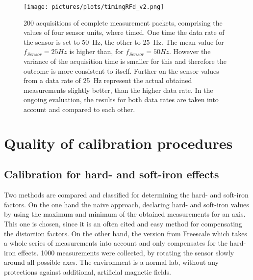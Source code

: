 \begin{figure}[h]
\centering
\texttt{[image: pictures/plots/timingRFd\_v2.png]}
\caption{200 acquisitions of complete measurement packets, comprising the values of four sensor units, where timed. One time the data rate of the sensor is set to \SI{50}{\Hz}, the other to \SI{25}{\Hz}. The mean value for $ f_{Sensor}=25\si{Hz} $ is higher than, for $ f_{Sensor}=50\si{Hz} $. However the variance of the acquisition time is smaller for this and therefore the outcome is more consistent to itself. Further on the sensor values from a data rate of \SI{25}{\Hz} represent the actual obtained measurements slightly better, than the higher data rate. In the ongoing evaluation, the results for both data rates are taken into account and compared to each other.}
\label{fig:sensTime}
\end{figure}




\section{Quality of calibration procedures} \label{sec:cali}

\subsection{Calibration for hard- and soft-iron effects}\label{subsec:resHardSoft}

Two methods are compared and classified for determining the hard- and soft-iron factors. On the one hand the naive approach, declaring hard- and soft-iron values by using the maximum and minimum of the obtained measurements for an axis. This one is chosen, since it is an often cited and easy method for compensating the distortion factors. On the other hand, the version from Freescale \cite{ozyagcilar2012calibrating} which takes a whole series of measurements into account and only compensates for the hard-iron effects. 1000 measurements were collected, by rotating the sensor slowly around all possible axes. The environment is a normal lab, without any protections against additional, artificial magnetic fields. 

